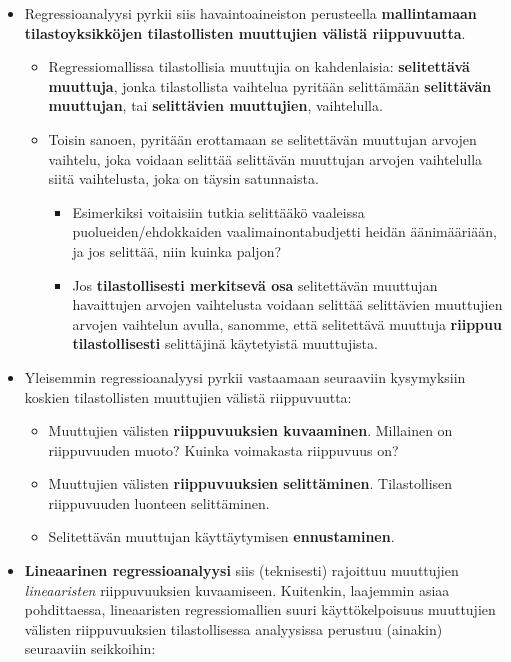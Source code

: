 \documentclass[
]{book}
\providecommand{\tightlist}{%
  \setlength{\itemsep}{0pt}\setlength{\parskip}{0pt}}
\begin{document}
\begin{itemize}
\tightlist
\item
  Regressioanalyysi pyrkii siis havaintoaineiston perusteella \textbf{mallintamaan tilastoyksikköjen tilastollisten muuttujien välistä riippuvuutta}.

  \begin{itemize}
  \tightlist
  \item
    Regressiomallissa tilastollisia muuttujia on kahdenlaisia: \textbf{selitettävä muuttuja}, jonka tilastollista vaihtelua pyritään selittämään \textbf{selittävän muuttujan}, tai \textbf{selittävien muuttujien}, vaihtelulla.
  \item
    Toisin sanoen, pyritään erottamaan se selitettävän muuttujan arvojen vaihtelu, joka voidaan selittää selittävän muuttujan arvojen vaihtelulla siitä vaihtelusta, joka on täysin satunnaista.

    \begin{itemize}
    \tightlist
    \item
      Esimerkiksi voitaisiin tutkia selittääkö vaaleissa puolueiden/ehdokkaiden vaalimainontabudjetti heidän äänimääriään, ja jos selittää, niin kuinka paljon?
    \item
      Jos \textbf{tilastollisesti merkitsevä osa} selitettävän muuttujan havaittujen arvojen vaihtelusta voidaan selittää selittävien muuttujien arvojen vaihtelun avulla, sanomme, että selitettävä muuttuja \textbf{riippuu tilastollisesti} selittäjinä käytetyistä muuttujista.
    \end{itemize}
  \end{itemize}
\item
  Yleisemmin regressioanalyysi pyrkii vastaamaan seuraaviin kysymyksiin koskien tilastollisten muuttujien välistä riippuvuutta:

  \begin{itemize}
  \tightlist
  \item
    Muuttujien välisten \textbf{riippuvuuksien kuvaaminen}. Millainen on riippuvuuden muoto? Kuinka voimakasta riippuvuus on?
  \item
    Muuttujien välisten \textbf{riippuvuuksien selittäminen}. Tilastollisen riippuvuuden luonteen selittäminen.
  \item
    Selitettävän muuttujan käyttäytymisen \textbf{ennustaminen}.
  \end{itemize}
\item
  \textbf{Lineaarinen regressioanalyysi} siis (teknisesti) rajoittuu muuttujien \emph{lineaaristen} riippuvuuksien kuvaamiseen. Kuitenkin, laajemmin asiaa pohdittaessa, lineaaristen regressiomallien suuri käyttökelpoisuus muuttujien välisten riippuvuuksien tilastollisessa analyysissa perustuu (ainakin) seuraaviin seikkoihin:


\end{itemize}
\end{document}
